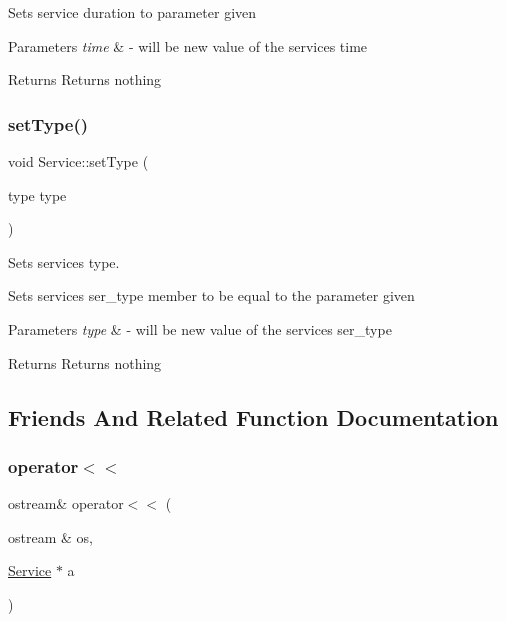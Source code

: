 Sets service duration to parameter given 
\begin{DoxyParams}{Parameters}
{\em time} & -\/ will be new value of the service\textquotesingle{}s time \\
\hline
\end{DoxyParams}
\begin{DoxyReturn}{Returns}
Returns nothing 
\end{DoxyReturn}
\mbox{\label{class_service_af26945add8ad6504432fa0c62c8c2769}} 
\subsubsection{\texorpdfstring{set\+Type()}{setType()}}
{\footnotesize\ttfamily void Service\+::set\+Type (\begin{DoxyParamCaption}\item[{type type}]{ }\end{DoxyParamCaption})}



Sets service\textquotesingle{}s type. 

Sets service\textquotesingle{}s ser\+\_\+type member to be equal to the parameter given 
\begin{DoxyParams}{Parameters}
{\em type} & -\/ will be new value of the service\textquotesingle{}s ser\+\_\+type \\
\hline
\end{DoxyParams}
\begin{DoxyReturn}{Returns}
Returns nothing 
\end{DoxyReturn}


\subsection{Friends And Related Function Documentation}
\mbox{\label{class_service_a641fd7efe1dd35ea19ac062c4e2ece45}} 
\subsubsection{\texorpdfstring{operator$<$$<$}{operator<<}}
{\footnotesize\ttfamily ostream\& operator$<$$<$ (\begin{DoxyParamCaption}\item[{ostream \&}]{os,  }\item[{\hyperlink{class_service}{Service} $\ast$}]{a }\end{DoxyParamCaption})\hspace{0.3cm}{\ttfamily [friend]}}

